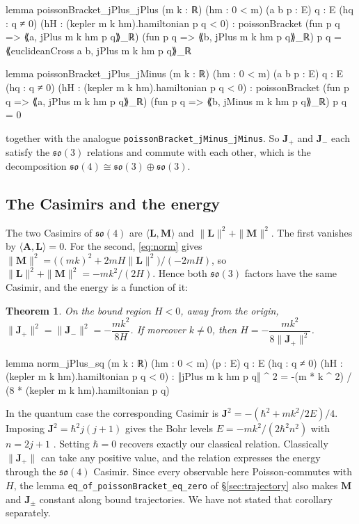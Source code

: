 \documentclass[11pt]{article}
\newtheorem{theorem}{Theorem}
\theoremstyle{definition}
\theoremstyle{remark}
\newcommand{\vA}{\mathbf{A}}
\newcommand{\vL}{\mathbf{L}}
\newcommand{\vM}{\mathbf{M}}
\newcommand{\vJ}{\mathbf{J}}
\newcommand{\ip}[2]{\langle #1, #2\rangle}
\begin{document}
\begin{lean}
lemma poissonBracket_jPlus_jPlus (m k : ℝ) (hm : 0 < m) (a b p : E) {q : E}
    (hq : q ≠ 0) (hH : (kepler m k hm).hamiltonian p q < 0) :
    poissonBracket (fun p q => ⟪a, jPlus m k hm p q⟫_ℝ)
      (fun p q => ⟪b, jPlus m k hm p q⟫_ℝ) p q =
      ⟪euclideanCross a b, jPlus m k hm p q⟫_ℝ

lemma poissonBracket_jPlus_jMinus (m k : ℝ) (hm : 0 < m) (a b p : E) {q : E}
    (hq : q ≠ 0) (hH : (kepler m k hm).hamiltonian p q < 0) :
    poissonBracket (fun p q => ⟪a, jPlus m k hm p q⟫_ℝ)
      (fun p q => ⟪b, jMinus m k hm p q⟫_ℝ) p q = 0
\end{lean}
together with the analogue \texttt{poissonBracket\_jMinus\_jMinus}. So $\vJ_+$ and $\vJ_-$ each
satisfy the $\mathfrak{so}(3)$ relations and commute with each other, which is the decomposition
$\mathfrak{so}(4)\cong\mathfrak{so}(3)\oplus\mathfrak{so}(3)$.

\subsection{The Casimirs and the energy}

The two Casimirs of $\mathfrak{so}(4)$ are $\ip{\vL}{\vM}$ and $\|\vL\|^2+\|\vM\|^2$. The first
vanishes by $\ip{\vA}{\vL}=0$. For the second, \eqref{eq:norm} gives
$\|\vM\|^2=\big((mk)^2+2mH\|\vL\|^2\big)/(-2mH)$, so $\|\vL\|^2+\|\vM\|^2=-mk^2/(2H)$. Hence
both $\mathfrak{so}(3)$ factors have the same Casimir, and the energy is a function of it:

\begin{theorem}
On the bound region $H<0$, away from the origin,
$\|\vJ_+\|^2=\|\vJ_-\|^2=-\dfrac{mk^2}{8H}$. If moreover $k\neq0$, then
$H=-\dfrac{mk^2}{8\|\vJ_+\|^2}$.
\end{theorem}

\begin{lean}
lemma norm_jPlus_sq (m k : ℝ) (hm : 0 < m) (p : E) {q : E} (hq : q ≠ 0)
    (hH : (kepler m k hm).hamiltonian p q < 0) :
    ‖jPlus m k hm p q‖ ^ 2 = -(m * k ^ 2) / (8 * (kepler m k hm).hamiltonian p q)
\end{lean}

In the quantum case the corresponding Casimir is $\vJ^2=-(\hbar^2+mk^2/2E)/4$. Imposing
$\vJ^2=\hbar^2 j(j+1)$ gives the Bohr levels $E=-mk^2/(2\hbar^2 n^2)$ with $n=2j+1$
\cite{pauli1926}. Setting $\hbar=0$ recovers exactly our classical relation. Classically
$\|\vJ_+\|$ can take any positive value, and the relation expresses the energy through the
$\mathfrak{so}(4)$ Casimir. Since every observable here Poisson-commutes with $H$, the lemma
\texttt{eq\_of\_poissonBracket\_eq\_zero} of \S\ref{sec:trajectory} also makes $\vM$ and
$\vJ_\pm$ constant along bound trajectories. We have not stated that corollary separately.
\end{document}
